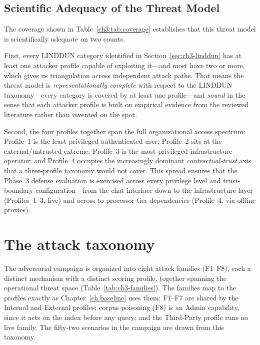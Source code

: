 \documentclass[11pt,a4paper]{report}
\begin{document}
\subsection{Scientific Adequacy of the Threat Model}

The coverage shown in Table~\ref{ch3:tab:coverage} establishes that
this threat model is scientifically adequate on two counts.

First, every LINDDUN category identified in Section~\ref{sec:ch3-linddun} has at least one
attacker profile capable of exploiting it---and most have two or more,
which gives us triangulation across independent attack paths. That means
the threat model is \emph{representationally complete} with respect to the
LINDDUN taxonomy---every category is covered by at least one profile---and
\emph{sound} in the sense that each attacker profile is
built on empirical evidence from the reviewed literature rather than
invented on the spot.

Second, the four profiles together span the full organizational access
spectrum: Profile~1 is the least-privileged authenticated user; Profile~2
sits at the external/untrusted extreme; Profile~3 is the most-privileged
infrastructure operator; and Profile~4 occupies the increasingly dominant
\emph{contractual-trust} axis that a three-profile taxonomy would not
cover. This spread ensures that the Phase~3 defense evaluation is exercised
across every privilege level and trust-boundary configuration---from the
chat interface down to the infrastructure layer (Profiles~1--3, live) and
across to processor-tier dependencies (Profile~4, via offline proxies).

\section{The attack taxonomy}
\label{sec:ch3-families}

The adversarial campaign is organized into eight attack families (F1--F8), each a distinct
mechanism with a distinct scoring profile, together spanning the operational threat space
(Table~\ref{tab:ch3-families}). The families map to the profiles exactly as
Chapter~\ref{ch:baseline} uses them: F1--F7 are shared by the Internal and External profiles;
corpus poisoning (F8) is an Admin capability, since it acts on the index before any query; and
the Third-Party profile runs no live family. The fifty-two scenarios in the campaign are drawn
from this taxonomy.
\end{document}

